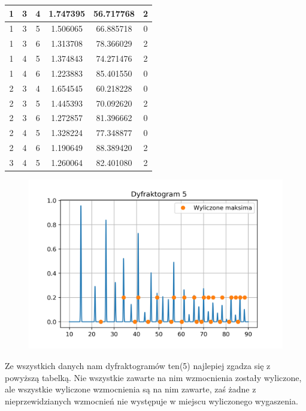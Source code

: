 \documentclass[a4paper,10pt]{article}
\begin{document}
\begin{tabular}{|cccccc|}
  1 &  3 &  4 &     1.747395 &            56.717768 &            2 \\\hline
  1 &  3 &  5 &     1.506065 &            66.885718 &            0 \\\hline
  1 &  3 &  6 &     1.313708 &            78.366029 &            2 \\\hline
  1 &  4 &  5 &     1.374843 &            74.271476 &            2 \\\hline
  1 &  4 &  6 &     1.223883 &            85.401550 &            0 \\\hline
  2 &  3 &  4 &     1.654545 &            60.218228 &            0 \\\hline
  2 &  3 &  5 &     1.445393 &            70.092620 &            2 \\\hline
  2 &  3 &  6 &     1.272857 &            81.396662 &            0 \\\hline
  2 &  4 &  5 &     1.328224 &            77.348877 &            0 \\\hline
  2 &  4 &  6 &     1.190649 &            88.389420 &            2 \\\hline
  3 &  4 &  5 &     1.260064 &            82.401080 &            2 \\\hline
\end{tabular}

\begin{figure}[H]
	\centering
		\includegraphics[width=\textwidth]{../Dyfraktogram.png}
\end{figure}

Ze wszystkich danych nam dyfraktogramów ten(5) najlepiej zgadza się z powyższą tabelką. Nie wszystkie zawarte na nim wzmocnienia zostały wyliczone, ale wszystkie wyliczone wzmocnienia są na nim zawarte, zaś żadne z nieprzewidzianych wzmocnień nie występuje w miejscu wyliczonego wygaszenia. 
\end{document}
